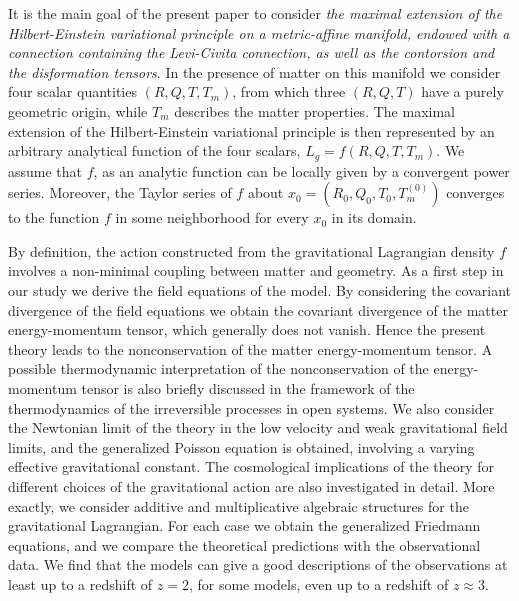 \documentclass[aps,superscriptaddress, showpacs,preprintnumbers, superscriptaddress, nofootinbibt,twocolumn]{revtex4}
\begin{document}
 It is the main goal of the present paper to consider {\it the maximal extension of the Hilbert-Einstein variational principle on a metric-affine manifold, endowed with a connection containing the Levi-Civita connection, as well as the contorsion and the disformation tensors}. In the presence of matter on this manifold we consider four scalar quantities $\left(R,Q,T,T_m\right)$, from which three $\left(R,Q,T\right)$ have a purely geometric origin, while $T_m$ describes the matter properties. The maximal extension of the Hilbert-Einstein variational principle is then represented by an arbitrary analytical function of the four scalars, $L_g=f\left(R,Q,T,T_m\right)$. We assume that $f$, as an  analytic function can be locally given by a convergent power series. Moreover, the Taylor series of $f$ about $x_0=\left(R_0,Q_0,T_0,T_m^{(0)}\right)$ converges to the function $f$ in some neighborhood for every $x_0$ in its domain.

  By definition, the action constructed from the gravitational Lagrangian density $f$ involves a non-minimal coupling between matter and geometry. As a first step in our study we derive the field equations of the model. By considering the covariant divergence of the field equations we obtain the covariant divergence of the matter energy-momentum tensor,  which generally does not vanish. Hence the present theory leads to the nonconservation of the matter energy-momentum tensor. A possible thermodynamic interpretation of the nonconservation of the energy-momentum tensor is also briefly discussed in the framework of the thermodynamics of the irreversible processes in open systems.  We also consider the Newtonian limit of the theory in the low velocity and weak gravitational field limits, and the generalized Poisson equation is obtained, involving a varying effective gravitational constant.  The cosmological implications of the theory for different choices of the gravitational action are also investigated in detail. More exactly, we consider additive and multiplicative algebraic structures for the gravitational Lagrangian.  For each case we obtain the generalized Friedmann equations, and we compare the theoretical predictions with the observational data. We find that the models can give a good descriptions of the observations at least up to a redshift of $z=2$, for some models, even up to a redshift of $z\approx 3$.
\end{document}
